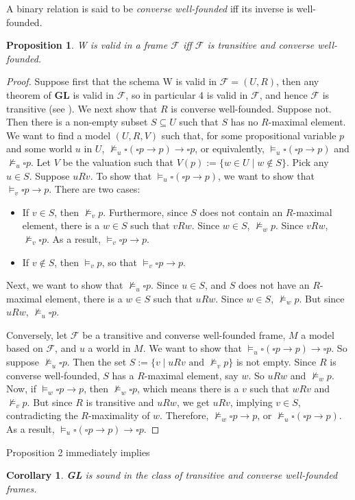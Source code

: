 \documentclass[12pt]{article}
\newtheorem{prop}{Proposition}
\newtheorem{cor}{Corollary}
\begin{document}
A binary relation is said to be \emph{converse well-founded} iff its inverse is well-founded.
\begin{prop} W is valid in a frame $\mathcal{F}$ iff $\mathcal{F}$ is transitive and converse well-founded. \end{prop}
\begin{proof}  
Suppose first that the schema W is valid in $\mathcal{F}=(U,R)$, then any theorem of \textbf{GL} is valid in $\mathcal{F}$, so in particular 4 is valid in $\mathcal{F}$, and hence $\mathcal{F}$ is transitive (see ).  We next show that $R$ is converse well-founded.  Suppose not.  Then there is a non-empty subset $S\subseteq U$ such that $S$ has no $R$-maximal element.  We want to find a model $(U,R,V)$ such that, for some propositional variable $p$ and some world $u$ in $U$, $\not \models_u \square (\square p \to p) \to \square p$, or equivalently, $\models_u \square (\square p\to p)$ and $\not \models_u \square p$.  Let $V$ be the valuation such that $V(p):=\lbrace w \in U \mid w \notin S \rbrace$.  Pick any $u\in S$.  Suppose $u R v$.  To show that $\models_u \square (\square p\to p)$, we want to show that $\models_v \square p \to p$.  There are two cases: 
\begin{itemize}
\item
If $v\in S$, then $\not \models_v p$.  Furthermore, since $S$ does not contain an $R$-maximal element, there is a $w\in S$ such that $v R w$.  Since $w\in S$, $\not\models_w p$.  Since $v R w$, $\not \models_v \square p$.  As a result, $\models_v \square p \to p$.
\item
If $v\notin S$, then $\models_v p$, so that $\models_v \square p \to p$.
\end{itemize}
Next, we want to show that $\not \models_u \square p$.  Since $u\in S$, and $S$ does not have an $R$-maximal element, there is a $w\in S$ such that $u R w$.  Since $w\in S$, $\not \models_w p$.  But since $u R w$, $\not \models_u \square p$.

Conversely, let $\mathcal{F}$ be a transitive and converse well-founded frame, $M$ a model based on $\mathcal{F}$, and $u$ a world in $M$.  We want to show that $\models_u \square (\square p\to p) \to \square p$.  So suppose $\not \models_u \square p$.  Then the set $S:=\lbrace v\mid u R v \mbox{ and } \not \models_v p \rbrace$ is not empty.  Since $R$ is converse well-founded, $S$ has a $R$-maximal element, say $w$.  So $u R w$ and $\not \models_w p$.  Now, if $\models_w \square p \to p$, then $\not \models_w \square p$, which means there is a $v$ such that $w R v$ and $\not \models_v p$.  But since $R$ is transitive and $u R w$, we get $u R v$, implying $v \in S$, contradicting the $R$-maximality of $w$.  Therefore, $\not \models_w \square p \to p$, or $\not \models_u \square (\square p \to p)$.  As a result, $\models_u \square (\square p \to p) \to \square p$.
\end{proof}
Proposition 2 immediately implies
\begin{cor} \textbf{GL} is sound in the class of transitive and converse well-founded frames. \end{cor}
\end{document}
